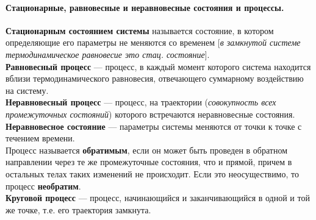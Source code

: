 \paragraph{Стационарные, равновесные и неравновесные состояния и процессы.}
\textbf{Стационарным состоянием системы} называется состояние, в котором определяющие его параметры не меняются со временем [\textit{в замкнутой системе термодинамическое равновесие это стац. состояние}].\\
\textbf{Равновесный процесс} --- процесс, в каждый момент которого система находится вблизи термодинамического равновесия, отвечающего суммарному воздействию на систему.\\
\textbf{Неравновесный процесс} --- процесс, на траектории (\textit{совокупность всех промежуточных состояний}) которого встречаются неравновесные состояния.\\
\textbf{Неравновесное состояние} --- параметры системы меняются от точки к точке с течением времени.\\
Процесс называется \textbf{обратимым}, если он может быть проведен в обратном направлении через те же промежуточные состояния, что и прямой, причем в остальных телах таких изменений не происходит. Если это неосуществимо, то процесс \textbf{необратим}. \\
\textbf{Круговой процесс} --- процесс, начинающийся и заканчивающийся в одной и той же точке, т.е. его траектория замкнута.